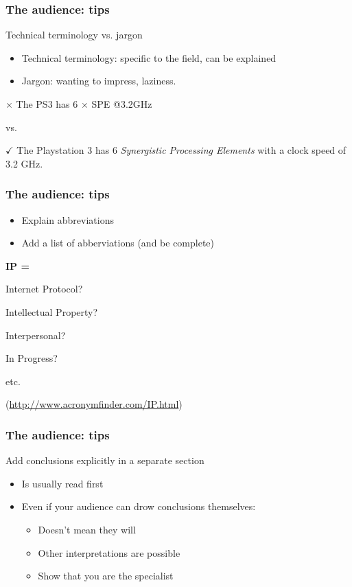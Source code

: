 \documentclass{beamer}
\begin{document}
\begin{frame}
  \frametitle{The audience: tips}

  Technical terminology vs. jargon

  \begin{itemize}
    \item Technical terminology: specific to the field, can be explained
    \item Jargon: wanting to impress, laziness.
  \end{itemize}

  \vfill

  \centering

  \textcolor{HoGentAccent2}{$\times$ The PS3 has 6 $\times$ SPE @3.2GHz}

  vs.

  \textcolor{HoGentAccent3}{$\checkmark$ The Playstation 3 has 6 \emph{Synergistic Processing Elements} with a clock speed of 3.2 GHz.}
\end{frame}

\begin{frame}
  \frametitle{The audience: tips}

  \begin{itemize}
    \item Explain abbreviations
    \item Add a list of abberviations (and be complete)
  \end{itemize}

  \vfill \centering

  \textbf{IP =}

  Internet Protocol?

  Intellectual Property?

  Interpersonal?

  In Progress?

  etc.

  (\url{http://www.acronymfinder.com/IP.html})

\end{frame}

\begin{frame}
  \frametitle{The audience: tips}

  Add conclusions explicitly in a separate section

  \begin{itemize}
    \item Is usually read first
    \item Even if your audience can drow conclusions themselves:
      \begin{itemize}
        \item Doesn't mean they will
        \item Other interpretations are possible
        \item Show that you are the specialist
      \end{itemize}
  \end{itemize}
\end{frame}
\end{document}
